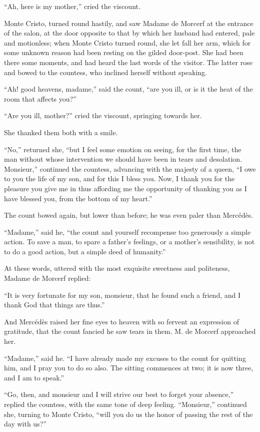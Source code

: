 “Ah, here is my mother,” cried the viscount.

Monte Cristo, turned round hastily, and saw Madame de Morcerf at the
entrance of the salon, at the door opposite to that by which her
husband had entered, pale and motionless; when Monte Cristo turned
round, she let fall her arm, which for some unknown reason had been
resting on the gilded door-post. She had been there some moments, and
had heard the last words of the visitor. The latter rose and bowed to
the countess, who inclined herself without speaking.

“Ah! good heavens, madame,” said the count, “are you ill, or is it the
heat of the room that affects you?”

“Are you ill, mother?” cried the viscount, springing towards her.

She thanked them both with a smile.

“No,” returned she, “but I feel some emotion on seeing, for the first
time, the man without whose intervention we should have been in tears
and desolation. Monsieur,” continued the countess, advancing with the
majesty of a queen, “I owe to you the life of my son, and for this I
bless you. Now, I thank you for the pleasure you give me in thus
affording me the opportunity of thanking you as I have blessed you,
from the bottom of my heart.”

The count bowed again, but lower than before; he was even paler than
Mercédès.

“Madame,” said he, “the count and yourself recompense too generously a
simple action. To save a man, to spare a father’s feelings, or a
mother’s sensibility, is not to do a good action, but a simple deed of
humanity.”

At these words, uttered with the most exquisite sweetness and
politeness, Madame de Morcerf replied:

“It is very fortunate for my son, monsieur, that he found such a
friend, and I thank God that things are thus.”

And Mercédès raised her fine eyes to heaven with so fervent an
expression of gratitude, that the count fancied he saw tears in them.
M. de Morcerf approached her.

“Madame,” said he. “I have already made my excuses to the count for
quitting him, and I pray you to do so also. The sitting commences at
two; it is now three, and I am to speak.”

“Go, then, and monsieur and I will strive our best to forget your
absence,” replied the countess, with the same tone of deep feeling.
“Monsieur,” continued she, turning to Monte Cristo, “will you do us the
honor of passing the rest of the day with us?”

